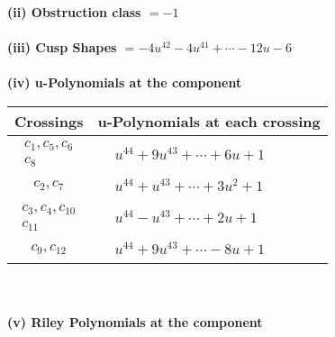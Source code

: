 \documentclass[1p]{elsarticle_modified}
\theoremstyle{definition}
\begin{document}
\flushleft \textbf{(ii) Obstruction class $= -1$}\\~\\
\flushleft \textbf{(iii) Cusp Shapes $= -4 u^{42}-4 u^{41}+\cdots-12 u-6$}\\~\\
\newpage\renewcommand{\arraystretch}{1}
\flushleft \textbf{(iv) u-Polynomials at the component}\newline \\
\begin{tabular}{m{50pt}|m{274pt}}
Crossings & \hspace{64pt}u-Polynomials at each crossing \\
\hline $$\begin{aligned}c_{1},c_{5},c_{6}\\c_{8}\end{aligned}$$&$\begin{aligned}
&u^{44}+9 u^{43}+\cdots+6 u+1
\end{aligned}$\\
\hline $$\begin{aligned}c_{2},c_{7}\end{aligned}$$&$\begin{aligned}
&u^{44}+u^{43}+\cdots+3 u^2+1
\end{aligned}$\\
\hline $$\begin{aligned}c_{3},c_{4},c_{10}\\c_{11}\end{aligned}$$&$\begin{aligned}
&u^{44}- u^{43}+\cdots+2 u+1
\end{aligned}$\\
\hline $$\begin{aligned}c_{9},c_{12}\end{aligned}$$&$\begin{aligned}
&u^{44}+9 u^{43}+\cdots-8 u+1
\end{aligned}$\\
\hline
\end{tabular}\\~\\
\newpage\renewcommand{\arraystretch}{1}
\flushleft \textbf{(v) Riley Polynomials at the component}\newline \\
\end{document}
